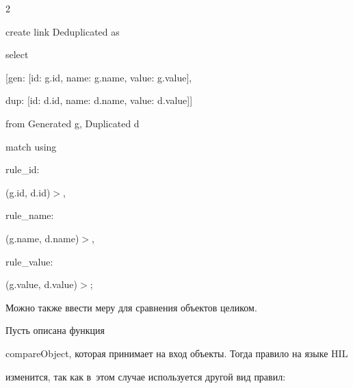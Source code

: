 \begin{multicols}{2}
{\noindent

  create link Deduplicated as



\noindent

  select



\noindent

  [gen: [id: g.id, name: g.name, value: g.value],



\noindent

  dup: [id: d.id, name: d.name, value: d.value]]



\noindent

  from Generated g, Duplicated d



\noindent

  match using



\noindent

  rule\_id:



\noindent

    (g.id, d.id)\;$>$,



\noindent

  rule\_name:



\noindent

    (g.name, d.name)\;$>$,



\noindent

  rule\_value:



\noindent

    (g.value, d.value)\;$>$;

    }



  Можно также ввести меру для сравнения объектов целиком.



  Пусть описана функция

{\sf compareObject}, которая принимает на вход объекты. Тогда правило на языке HIL

изменится, так как в~этом случае используется другой вид правил:




\end{multicols}
